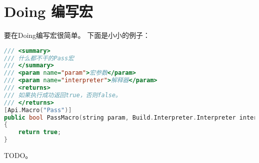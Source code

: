 \chapter{Doing 编写宏}
要在Doing编写宏很简单。\newline{}
下面是小小的例子：
\begin{lstlisting}[language=C++]
/// <summary>
/// 什么都不干的Pass宏
/// </summary>
/// <param name="param">宏参数</param>
/// <param name="interpreter">解释器</param>
/// <returns>
/// 如果执行成功返回true，否则false。
/// </returns>
[Api.Macro("Pass")]
public bool PassMacro(string param, Build.Interpreter.Interpreter interpreter)
{
	return true;
}
\end{lstlisting}
TODO。



